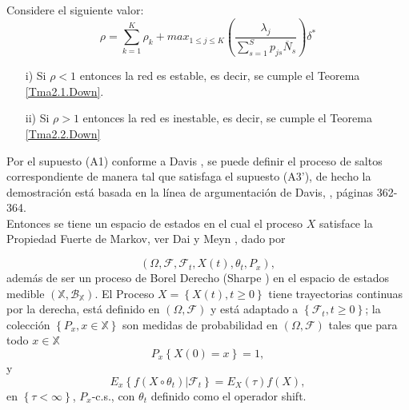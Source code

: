 \begin{Teo}\label{Tma2.3.Down}
Considere el siguiente valor:
\begin{equation}\label{Eq.Rho.1serv}
\rho=\sum_{k=1}^{K}\rho_{k}+max_{1\leq j\leq K}\left(\frac{\lambda_{j}}{\sum_{s=1}^{S}p_{js}\overline{N}_{s}}\right)\delta^{*}
\end{equation}
\begin{itemize}
\item[i)] Si $\rho<1$ entonces la red es estable, es decir, se
cumple el Teorema \ref{Tma2.1.Down}.

\item[ii)] Si $\rho>1$ entonces la red es inestable, es decir, se
cumple el Teorema \ref{Tma2.2.Down}
\end{itemize}
\end{Teo}

Por el supuesto (A1) conforme a Davis \cite{Davis}, se puede
definir el proceso de saltos correspondiente de manera tal que
satisfaga el supuesto (A3'), de hecho la demostraci\'on est\'a
basada en la l\'inea de argumentaci\'on de Davis, \cite{Davis},
p\'aginas 362-364.\\

Entonces se tiene un espacio de estados en el cual el proceso $X$
satisface la Propiedad Fuerte de Markov, ver Dai y Meyn
\cite{DaiSean}, dado por

\[\left(\Omega,\mathcal{F},\mathcal{F}_{t},X\left(t\right),\theta_{t},P_{x}\right),\]
adem\'as de ser un proceso de Borel Derecho (Sharpe \cite{Sharpe})
en el espacio de estados medible
$\left(\mathbb{X},\mathcal{B}_\mathbb{X}\right)$. El Proceso
$X=\left\{X\left(t\right),t\geq0\right\}$ tiene trayectorias
continuas por la derecha, est\'a definido en
$\left(\Omega,\mathcal{F}\right)$ y est\'a adaptado a
$\left\{\mathcal{F}_{t},t\geq0\right\}$; la colecci\'on
$\left\{P_{x},x\in \mathbb{X}\right\}$ son medidas de probabilidad
en $\left(\Omega,\mathcal{F}\right)$ tales que para todo $x\in
\mathbb{X}$
\[P_{x}\left\{X\left(0\right)=x\right\}=1,\] y
\[E_{x}\left\{f\left(X\circ\theta_{t}\right)|\mathcal{F}_{t}\right\}=E_{X}\left(\tau\right)f\left(X\right),\]
en $\left\{\tau<\infty\right\}$, $P_{x}$-c.s., con $\theta_{t}$
definido como el operador shift.


